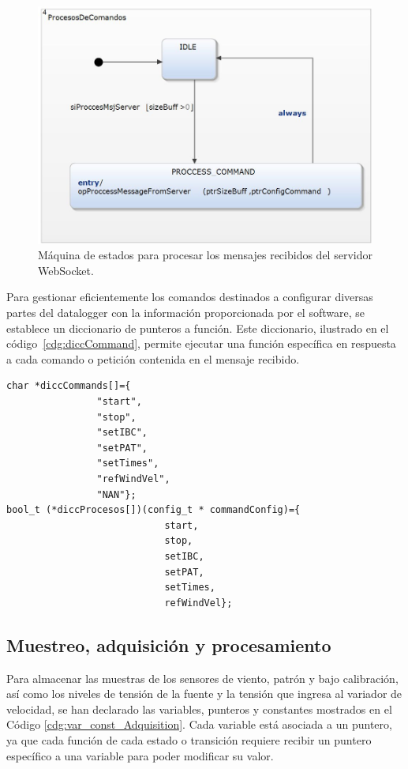 \begin{figure}[H]
    \centering
    \includegraphics[width=0.6\linewidth]{Figuras/datalogger/Firmware/processComand.jpg}
    \caption{Máquina de estados para procesar los mensajes recibidos del servidor WebSocket.}
    \label{fig:processComand}
\end{figure}

Para gestionar eficientemente los comandos destinados a configurar diversas partes del datalogger con la información proporcionada por el software, se establece un diccionario de punteros a función. Este diccionario, ilustrado en el código~\ref{cdg:diccCommand}, permite ejecutar una función específica en respuesta a cada comando o petición contenida en el mensaje recibido.

\begin{lstlisting}[style=cstyle, caption={Funciones que permiten configurar o modificar el comportamiento del dataloger.}, label=cdg:diccCommand,basicstyle=\ttfamily\fontsize{8}{8}\selectfont]
char *diccCommands[]={
				"start",
				"stop",
				"setIBC",
				"setPAT",
				"setTimes",
				"refWindVel",
				"NAN"};
bool_t (*diccProcesos[])(config_t * commandConfig)={
							start,
							stop,
							setIBC,
							setPAT,
							setTimes,
							refWindVel};

\end{lstlisting}


\subsection{Muestreo, adquisición y procesamiento}\label{sec:muestreo_adquisicion_procesamiento}

Para almacenar las muestras de los sensores de viento, patrón y bajo calibración, así como los niveles de tensión de la fuente y la tensión que ingresa al variador de velocidad, se han declarado las variables, punteros y constantes mostrados en el Código \ref{cdg:var_const_Adquisition}. Cada variable está asociada a un puntero, ya que cada función de cada estado o transición requiere recibir un puntero específico a una variable para poder modificar su valor.

